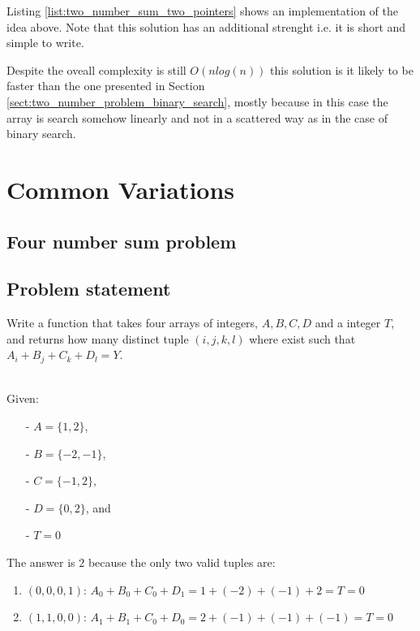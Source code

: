 Listing \ref{list:two_number_sum_two_pointers} shows an implementation of the idea above.  Note that
this solution has an additional strenght i.e.  it is short and simple to write. 



Despite the oveall complexity is still $O(n log(n))$ this solution is it likely to be faster than
the one presented in Section \ref{sect:two_number_problem_binary_search}, mostly because in this
case the array is search somehow linearly and not in a scattered way as in the case of binary
search.

\section{Common Variations}
\subsection{Four number sum problem}
\label{sec:four_number}

\subsection{Problem statement}

\begin{exercise}
Write a function that takes four arrays of integers, $A,B,C,D$ and a integer $T$,
and returns how many distinct tuple $(i,j,k,l)$ where exist such that 
$A_i+B_j+C_k+D_l = Y$.

\begin{example}
\hfill \\
Given:
	\begin{itemize}
		\item[-] 	$A=\{1,2\}$,
		\item[-] 	$B=\{-2,-1\}$,
		\item[-] 	$C=\{-1,2\}$,
		\item[-]	$D=\{0,2\}$, and 
		\item[-] 	$T = 0$
	\end{itemize}
The answer is $2$ because the only two valid tuples are:
\begin{enumerate}
	\item $(0,0,0,1)$: $A_0 + B_0 + C_0 + D_1 = 1 + (-2) + (-1) + 2 = T = 0$
	\item $(1,1,0,0)$: $A_1 + B_1 + C_0 + D_0 = 2 + (-1) + (-1) + (-1) = T = 0$
\end{enumerate}
\end{example}
\end{exercise}

